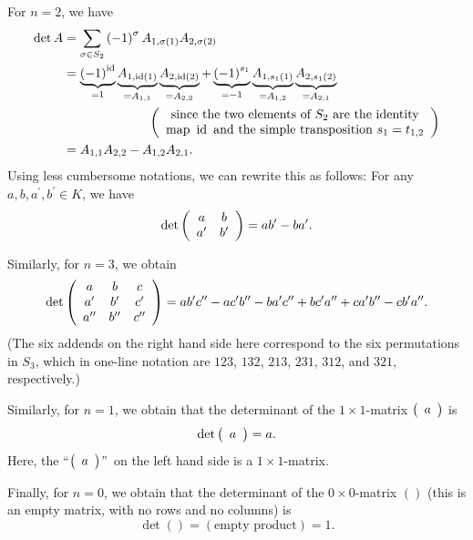 \begin{example}
For $n=2$, we have%
\begin{align*}
\det A  &  =\sum_{\sigma\in S_{2}}\left(  -1\right)  ^{\sigma}A_{1,\sigma
\left(  1\right)  }A_{2,\sigma\left(  2\right)  }\\
&  =\underbrace{\left(  -1\right)  ^{\operatorname*{id}}}_{=1}%
\underbrace{A_{1,\operatorname*{id}\left(  1\right)  }}_{=A_{1,1}%
}\underbrace{A_{2,\operatorname*{id}\left(  2\right)  }}_{=A_{2,2}%
}+\underbrace{\left(  -1\right)  ^{s_{1}}}_{=-1}\underbrace{A_{1,s_{1}\left(
1\right)  }}_{=A_{1,2}}\underbrace{A_{2,s_{1}\left(  2\right)  }}_{=A_{2,1}}\\
&  \ \ \ \ \ \ \ \ \ \ \ \ \ \ \ \ \ \ \ \ \left(
\begin{array}
[c]{c}%
\text{since the two elements of }S_{2}\text{ are the identity}\\
\text{map }\operatorname*{id}\text{ and the simple transposition }%
s_{1}=t_{1,2}%
\end{array}
\right) \\
&  =A_{1,1}A_{2,2}-A_{1,2}A_{2,1}.
\end{align*}
Using less cumbersome notations, we can rewrite this as follows: For any
$a,b,a^{\prime},b^{\prime}\in K$, we have%
\[
\det\left(
\begin{array}
[c]{cc}%
a & b\\
a^{\prime} & b^{\prime}%
\end{array}
\right)  =ab^{\prime}-ba^{\prime}.
\]


Similarly, for $n=3$, we obtain%
\[
\det\left(
\begin{array}
[c]{ccc}%
a & b & c\\
a^{\prime} & b^{\prime} & c^{\prime}\\
a^{\prime\prime} & b^{\prime\prime} & c^{\prime\prime}%
\end{array}
\right)  =ab^{\prime}c^{\prime\prime}-ac^{\prime}b^{\prime\prime}-ba^{\prime
}c^{\prime\prime}+bc^{\prime}a^{\prime\prime}+ca^{\prime}b^{\prime\prime
}-cb^{\prime}a^{\prime\prime}.
\]
(The six addends on the right hand side here correspond to the six
permutations in $S_{3}$, which in one-line notation are $123$, $132$, $213$,
$231$, $312$, and $321$, respectively.)

Similarly, for $n=1$, we obtain that the determinant of the $1\times1$-matrix
$\left(
\begin{array}
[c]{c}%
a
\end{array}
\right)  $ is%
\[
\det\left(
\begin{array}
[c]{c}%
a
\end{array}
\right)  =a.
\]
Here, the \textquotedblleft$\left(
\begin{array}
[c]{c}%
a
\end{array}
\right)  $\textquotedblright\ on the left hand side is a $1\times1$-matrix.

Finally, for $n=0$, we obtain that the determinant of the $0\times0$-matrix
$\left(  {}\right)  $ (this is an empty matrix, with no rows and no columns)
is%
\[
\det\left(  {}\right)  =\left(  \text{empty product}\right)  =1.
\]

\end{example}


